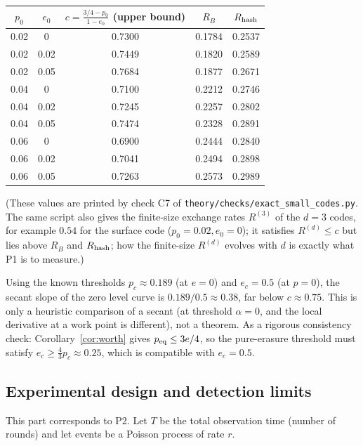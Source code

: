 \begin{center}
\begin{tabular}{cc ccc}
\toprule
$p_0$ & $e_0$ & $c=\frac{3/4-p_0}{1-e_0}$ (upper bound) & $R_B$ & $R_{\rm hash}$ \\
\midrule
0.02 & 0    & 0.7300 & 0.1784 & 0.2537 \\
0.02 & 0.02 & 0.7449 & 0.1820 & 0.2589 \\
0.02 & 0.05 & 0.7684 & 0.1877 & 0.2671 \\
0.04 & 0    & 0.7100 & 0.2212 & 0.2746 \\
0.04 & 0.02 & 0.7245 & 0.2257 & 0.2802 \\
0.04 & 0.05 & 0.7474 & 0.2328 & 0.2891 \\
0.06 & 0    & 0.6900 & 0.2444 & 0.2840 \\
0.06 & 0.02 & 0.7041 & 0.2494 & 0.2898 \\
0.06 & 0.05 & 0.7263 & 0.2573 & 0.2989 \\
\bottomrule
\end{tabular}
\end{center}
(These values are printed by check C7 of \texttt{theory/checks/exact\_small\_codes.py}. The same script also gives the finite-size exchange rates $R^{(3)}$ of the $d=3$ codes,
for example $0.54$ for the surface code ($p_0=0.02,e_0=0$); it satisfies $R^{(d)}\le c$ but lies above $R_B$ and $R_{\rm hash}$;
how the finite-size $R^{(d)}$ evolves with $d$ is exactly what P1 is to measure.)

\begin{remark}
Using the known thresholds $p_c\approx0.189$ (at $e=0$) and $e_c=0.5$ (at $p=0$), the secant slope of the zero level curve is $0.189/0.5\approx0.38$,
far below $c\approx0.75$. This is only a heuristic comparison of a secant (at threshold $\alpha=0$, and the local derivative at a work point is different), not a theorem.
As a rigorous consistency check: Corollary~\ref{cor:worth} gives $p_{\rm eq}\le3e/4$, so the pure-erasure threshold must satisfy
$e_c\ge\tfrac43p_c\approx0.25$, which is compatible with $e_c=0.5$.
\end{remark}

\subsection{Experimental design and detection limits}\label{sec:design}

This part corresponds to P2. Let $T$ be the total observation time (number of rounds) and let events be a Poisson process of rate $r$.

